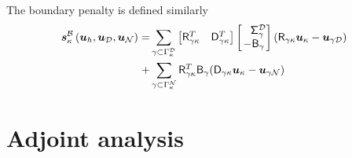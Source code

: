 \documentclass{beamer}
\begin{document}
\begin{frame}
    The boundary penalty is defined similarly
    \begin{equation*}
    \begin{aligned}
    \bm{s}_{\kappa}^{\fnc{B}}\left(\bm{u}_{h}, \bm{u}_\fnc{D}, \bm{u}_\fnc{N}\right)
    =& \sum_{\gamma \subset \Gamma_\kappa^{\fnc{D}}}
    \begin{bmatrix} \Rgk^T & \Dgk^T \end{bmatrix}
    \begin{bmatrix} \phnt{-}\Sig_{\gamma}^{\fnc{D}} \\ -\Bg \end{bmatrix}
    (\Rgk \Ukp -\bm{u}_{\gamma {\fnc{D}}}) \\
    +& \sum_{\gamma \subset \Gamma_\kappa^{\fnc{N}}} \Rgk^{T}\B_{\gamma} (\Dgk \Ukp - \bm{u}_{\gamma {\fnc{N}}})
    \end{aligned}
    \end{equation*}
\end{frame}

\section{Adjoint analysis}
\end{document}

